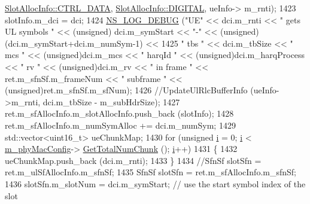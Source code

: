 \begin{DoxyCode}
      \hyperlink{structns3_1_1SlotAllocInfo_a3ea7cb503bfd0c9a4df55a71b81b9331a1ea636c3f068558fabacbc39934309b8}{SlotAllocInfo::CTRL\_DATA}, \hyperlink{structns3_1_1SlotAllocInfo_adcbd067d82be6260b3399167d8f0b4eca47a67c342db658a08ded9ce4b49417ea}{SlotAllocInfo::DIGITAL}, ueInfo->
      m\_rnti);
1423                         slotInfo.m\_dci = dci;
1424                         \hyperlink{group__logging_ga413f1886406d49f59a6a0a89b77b4d0a}{NS\_LOG\_DEBUG} (\textcolor{stringliteral}{"UE"} << dci.m\_rnti << \textcolor{stringliteral}{" gets UL symbols "} << (\textcolor{keywordtype}{unsigned})
      dci.m\_symStart << \textcolor{stringliteral}{"-"} << (\textcolor{keywordtype}{unsigned})(dci.m\_symStart+dci.m\_numSym-1) <<
1425                                                                                 \textcolor{stringliteral}{" tbs "} << dci.m\_tbSize << \textcolor{stringliteral}{
      " mcs "} << (\textcolor{keywordtype}{unsigned})dci.m\_mcs << \textcolor{stringliteral}{" harqId "} << (\textcolor{keywordtype}{unsigned})dci.m\_harqProcess << \textcolor{stringliteral}{" rv "} << (\textcolor{keywordtype}{unsigned})dci.m\_rv 
      << \textcolor{stringliteral}{" in frame "} << ret.m\_sfnSf.m\_frameNum << \textcolor{stringliteral}{" subframe "} << (\textcolor{keywordtype}{unsigned})ret.m\_sfnSf.m\_sfNum);
1426                         \textcolor{comment}{//UpdateUlRlcBufferInfo (ueInfo->m\_rnti, dci.m\_tbSize - m\_subHdrSize);}
1427                         ret.m\_sfAllocInfo.m\_slotAllocInfo.push\_back (slotInfo);
1428                         ret.m\_sfAllocInfo.m\_numSymAlloc += dci.m\_numSym;
1429                         std::vector<uint16\_t> ueChunkMap;
1430                         \textcolor{keywordflow}{for} (\textcolor{keywordtype}{unsigned} \hyperlink{bernuolliDistribution_8m_a6f6ccfcf58b31cb6412107d9d5281426}{i} = 0; \hyperlink{bernuolliDistribution_8m_a6f6ccfcf58b31cb6412107d9d5281426}{i} < \hyperlink{classns3_1_1MmWaveMacScheduler_a24d7af4971d2e500fe543cefbafa2fd9}{m\_phyMacConfig}->
      \hyperlink{classns3_1_1MmWavePhyMacCommon_a97e82c809a351fea9d5058ac1bb4c3c6}{GetTotalNumChunk} (); \hyperlink{bernuolliDistribution_8m_a6f6ccfcf58b31cb6412107d9d5281426}{i}++)
1431                         \{
1432                                 ueChunkMap.push\_back (dci.m\_rnti);
1433                         \}
1434                         \textcolor{comment}{//SfnSf slotSfn = ret.m\_ulSfAllocInfo.m\_sfnSf;}
1435                         SfnSf slotSfn = ret.m\_sfAllocInfo.m\_sfnSf;
1436                         slotSfn.m\_slotNum = dci.m\_symStart;  \textcolor{comment}{// use the start symbol index of the slot
}
\end{DoxyCode}
